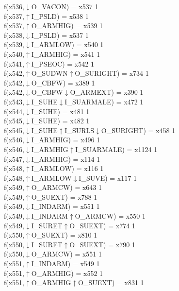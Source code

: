 f(x536,$\downarrow$O\_VACON) = x537 {1} \\
f(x537,$\uparrow$I\_PSLD) = x538 {1} \\
f(x537,$\uparrow$O\_ARMHIG) = x539 {1} \\
f(x538,$\downarrow$I\_PSLD) = x537 {1} \\
f(x539,$\downarrow$I\_ARMLOW) = x540 {1} \\
f(x540,$\uparrow$I\_ARMHIG) = x541 {1} \\
f(x541,$\uparrow$I\_PSEOC) = x542 {1} \\
f(x542,$\uparrow$O\_SUDWN$\uparrow$O\_SURIGHT) = x734 {1} \\
f(x542,$\downarrow$O\_CBFW) = x389 {1} \\
f(x542,$\downarrow$O\_CBFW$\downarrow$O\_ARMEXT) = x390 {1} \\
f(x543,$\downarrow$I\_SUHE$\downarrow$I\_SUARMALE) = x472 {1} \\
f(x544,$\downarrow$I\_SUHE) = x481 {1} \\
f(x545,$\downarrow$I\_SUHE) = x482 {1} \\
f(x545,$\downarrow$I\_SUHE$\uparrow$I\_SURLS$\downarrow$O\_SURIGHT) = x458 {1} \\
f(x546,$\downarrow$I\_ARMHIG) = x496 {1} \\
f(x546,$\downarrow$I\_ARMHIG$\uparrow$I\_SUARMALE) = x1124 {1} \\
f(x547,$\downarrow$I\_ARMHIG) = x114 {1} \\
f(x548,$\uparrow$I\_ARMLOW) = x116 {1} \\
f(x548,$\uparrow$I\_ARMLOW$\downarrow$I\_SUVE) = x117 {1} \\
f(x549,$\uparrow$O\_ARMCW) = x643 {1} \\
f(x549,$\uparrow$O\_SUEXT) = x788 {1} \\
f(x549,$\downarrow$I\_INDARM) = x551 {1} \\
f(x549,$\downarrow$I\_INDARM$\uparrow$O\_ARMCW) = x550 {1} \\
f(x549,$\downarrow$I\_SURET$\uparrow$O\_SUEXT) = x774 {1} \\
f(x550,$\uparrow$O\_SUEXT) = x810 {1} \\
f(x550,$\downarrow$I\_SURET$\uparrow$O\_SUEXT) = x790 {1} \\
f(x550,$\downarrow$O\_ARMCW) = x551 {1} \\
f(x551,$\uparrow$I\_INDARM) = x549 {1} \\
f(x551,$\uparrow$O\_ARMHIG) = x552 {1} \\
f(x551,$\uparrow$O\_ARMHIG$\uparrow$O\_SUEXT) = x831 {1} \\
